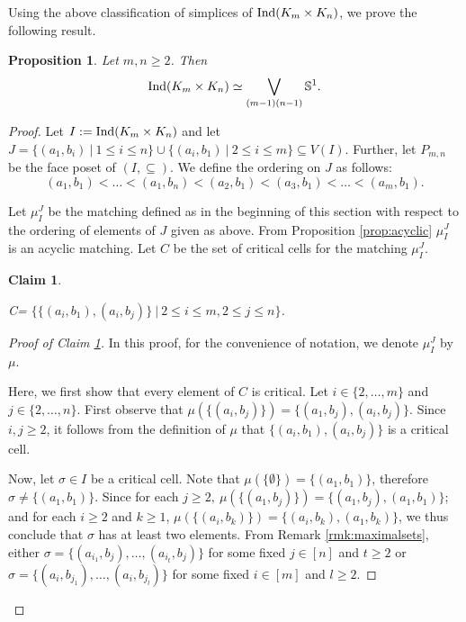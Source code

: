 \documentclass[12pt]{article}
\numberwithin{thm}{section}
\newtheorem{claim}{Claim}
\newtheorem{prop}[thm]{Proposition}
\theoremstyle{definition}
\newcommand{\bS}{\mathbb{S}}
\newcommand{\ind}{{\rm{Ind}}}
\begin{document}
  Using the above classification of simplices of $\ind(K_m\times K_n)$, we  prove the following result.
  
 
\begin{prop}\label{thm:indkmkn}
	Let $m,n \geq 2$. Then
	$$\emph{\ind}(K_m \times K_n) \simeq \bigvee\limits_{(m-1)(n-1)} \bS^1.$$
\end{prop}
\begin{proof}
Let $I : = \ind(K_m \times K_n)$ and let $J=\{(a_1, b_i) ~|~  1 \leq i \leq n\}  \cup \{(a_i, b_1) ~| \ 2 \leq i \leq m\} \subseteq V(I)$. Further, let $P_{m,n}$ be the face poset of $(I, \subseteq)$.  We define the ordering on $J$ as follows:
\begin{equation*}
	(a_1, b_1) < \ldots < (a_1, b_n) < (a_2, b_1) < {(a_3, b_1)} < \ldots  < (a_m, b_1).
\end{equation*}

Let $\mu_{I}^{J}$ be the matching defined as in the beginning of this section with respect to the ordering of elements of $J$ given as above. From Proposition \ref{prop:acyclic} $\mu_{I}^J$ is an acyclic matching. Let $C$ be the set of critical cells for the  matching $\mu_I^{J}$.

\begin{claim}\label{claim:criticalcell}

C= $\{\{(a_i, b_1), (a_i, b_j)\} \  | \   2 \leq i \leq m, 2 \leq  j \leq n \}$.
\end{claim}

\begin{proof}[Proof of Claim \ref{claim:criticalcell}] In this proof, for the convenience of notation,  we  denote  $\mu_I^J$ by $\mu$. 

Here, we first show that every element of $C$ is critical. Let $i \in \{2, \ldots, m\}$ and $j \in \{2, \ldots, n\}$. First observe that $\mu(\{(a_i, b_j)\}) = \{(a_1, b_j), (a_i, b_j)\}$. Since $i, j \geq 2$, it follows from the definition of $\mu$ that $\{(a_i,b_1),(a_i,b_j)\}$ is a critical cell. 


Now, let $\sigma \in I$ be a critical cell. Note that $\mu(\{\emptyset\}) = \{(a_1, b_1)\}$,  therefore $\sigma \neq \{(a_1, b_1)\}$.  Since for each $j \geq 2,\  \mu(\{(a_1, b_j)\}) = \{(a_1, b_j),(a_1, b_1) \}$; and for each $i \geq 2$ and $k \geq 1$, $\mu(\{(a_i, b_k)\} ) = \{(a_i, b_k), (a_1, b_k)\}$, we thus conclude that $\sigma$ has at least two elements. 
From Remark \ref{rmk:maximalsets}, either  $\sigma = \{(a_{i_1}, b_{j}), \ldots,(a_{i_t}, b_{j})\}$ for some fixed $j  \in [n]$ and $t \geq 2$ or 
$\sigma = \{(a_i, b_{j_1}), \ldots,(a_i, b_{j_l})\}$ for some fixed $i \in [m]$ and $l \geq 2$.


\end{proof}
\end{proof}
\end{document}
